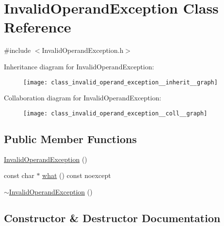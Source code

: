 \hypertarget{class_invalid_operand_exception}{}\section{Invalid\+Operand\+Exception Class Reference}
\label{class_invalid_operand_exception}


{\ttfamily \#include $<$Invalid\+Operand\+Exception.\+h$>$}



Inheritance diagram for Invalid\+Operand\+Exception\+:
\nopagebreak
\begin{figure}[H]
\begin{center}
\leavevmode
\texttt{[image: class\_invalid\_operand\_exception\_\_inherit\_\_graph]}
\end{center}
\end{figure}


Collaboration diagram for Invalid\+Operand\+Exception\+:
\nopagebreak
\begin{figure}[H]
\begin{center}
\leavevmode
\texttt{[image: class\_invalid\_operand\_exception\_\_coll\_\_graph]}
\end{center}
\end{figure}
\subsection*{Public Member Functions}
\begin{DoxyCompactItemize}
\item 
\mbox{\hyperlink{class_invalid_operand_exception_a17d683c71d66e8adb24c9b14111f2197}{Invalid\+Operand\+Exception}} ()
\item 
const char $\ast$ \mbox{\hyperlink{class_invalid_operand_exception_af88b818c60987c568ac8b1a26cf8759c}{what}} () const noexcept
\item 
\mbox{\hyperlink{class_invalid_operand_exception_aa687819eb27ede19044f1e6367ccb2aa}{$\sim$\+Invalid\+Operand\+Exception}} ()
\end{DoxyCompactItemize}


\subsection{Constructor \& Destructor Documentation}
\mbox{\label{class_invalid_operand_exception_a17d683c71d66e8adb24c9b14111f2197}} 
